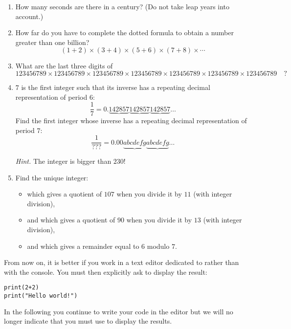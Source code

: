 \documentclass[11pt,class=report,crop=false]{standalone}
\begin{document}
\begin{activite}


\begin{enumerate}
  \item How many seconds are there in a century? (Do not take leap years into account.)
  
  \item How far do you have to complete the dotted formula to obtain a number greater than one billion?
  $$(1+2)\times(3+4)\times(5+6)\times(7+8)\times\cdots$$
  
  \item What are the last three digits of 
  $$123456789 \times 123456789 \times 123456789 \times 123456789 \times 123456789 \times 123456789 \times 123456789 \quad ?$$
  
  \item $7$ is the first integer such that its inverse has a repeating decimal representation of period $6$:
  $$\frac{1}{7} = 0.\underbrace{142857}\underbrace{142857}\underbrace{142857}\ldots$$ 
  Find the first integer whose inverse has a repeating decimal representation of period $7$:
  $$\frac{1}{???} = 0.00\underbrace{abcdefg}\underbrace{abcdefg}\ldots$$
  
  \emph{Hint.} The integer is bigger than $230$!
  
  \item Find the unique integer:
  \begin{itemize}
    \item which gives a quotient of $107$ when you divide it by $11$ (with integer division),
    \item and which gives a quotient of $90$ when you divide it by $13$ (with integer division),
    \item and which gives a remainder equal to $6$ modulo $7$.
  \end{itemize}
    
\end{enumerate}

\end{activite}


\begin{cours}
From now on, it is better if you work in a text editor dedicated to \Python{} rather than with the console. You must then explicitly ask to display the result:
\begin{lstlisting}
print(2+2)
print("Hello world!")
\end{lstlisting}

In the following you continue to write your code in the editor but we will no longer indicate that you must use  to display the results.
\end{cours}
\end{document}
